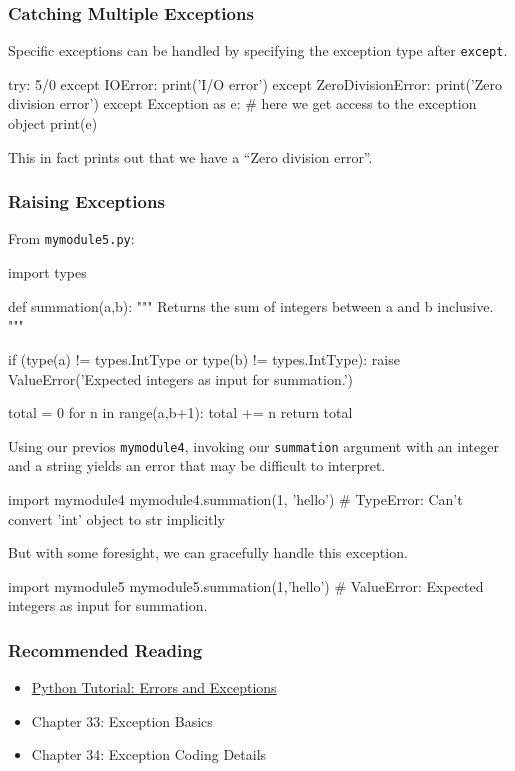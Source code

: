 \documentclass[12pt,letterpaper,twoside]{article}
\begin{document}
\subsubsection{Catching Multiple Exceptions}
Specific exceptions can be handled by specifying the exception type
after \texttt{except}.

\begin{python}
try:
    5/0
except IOError:
    print('I/O error')
except ZeroDivisionError:
    print('Zero division error')
except Exception as e:
    # here we get access to the exception object
    print(e)
\end{python}

This in fact prints out that we have a ``Zero division error''.

\subsubsection{Raising Exceptions}
From \texttt{mymodule5.py}:

\begin{python}
import types

def summation(a,b):
    """
    Returns the sum of integers between a and b inclusive.
    """

    if (type(a) != types.IntType or type(b) != types.IntType):
        raise ValueError('Expected integers as input for summation.')

    total = 0
    for n in range(a,b+1):
        total += n
    return total
\end{python}

Using our previos \texttt{mymodule4}, invoking our \texttt{summation} argument with 
an integer and a string yields an error that may be difficult to interpret.

\begin{python}
import mymodule4
mymodule4.summation(1, 'hello')     # TypeError: Can't convert 'int' object to str implicitly
\end{python}

But with some foresight, we can gracefully handle this exception.

\begin{python}
import mymodule5
mymodule5.summation(1,'hello')      # ValueError: Expected integers as input for summation.
\end{python}

\subsubsection{Recommended Reading}
\begin{itemize}
\item
  \href{https://docs.python.org/3/tutorial/errors.html}{Python Tutorial:
  Errors and Exceptions}
\item
  Chapter 33: Exception Basics
\item
  Chapter 34: Exception Coding Details
\end{itemize}
\end{document}
